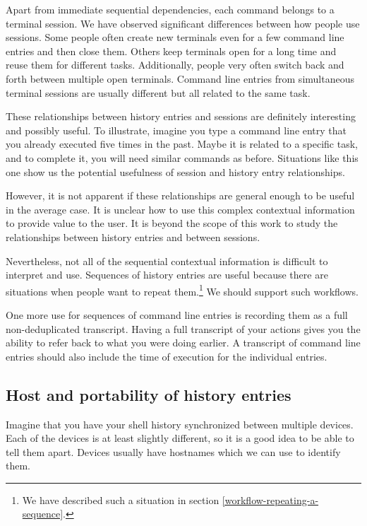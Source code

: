 Apart from immediate sequential dependencies, each command belongs to a terminal session. We have observed significant differences between how people use sessions. Some people often create new terminals even for a few command line entries and then close them. Others keep terminals open for a long time and reuse them for different tasks.
Additionally, people very often switch back and forth between multiple open terminals. Command line entries from simultaneous terminal sessions are usually different but all related to the same task.

These relationships between history entries and sessions are definitely interesting and possibly useful. To illustrate, imagine you type a command line entry that you already executed five times in the past. Maybe it is related to a specific task, and to complete it, you will need similar commands as before. Situations like this one show us the potential usefulness of session and history entry relationships.

However, it is not apparent if these relationships are general enough to be useful in the average case. It is unclear how to use this complex contextual information to provide value to the user. It is beyond the scope of this work to study the relationships between history entries and between sessions.

Nevertheless, not all of the sequential contextual information is difficult to interpret and use. Sequences of history entries are useful because there are situations when people want to repeat them.\footnote{We have described such a situation in section \ref{workflow-repeating-a-sequence}.} We should support such workflows.

One more use for sequences of command line entries is recording them as a full non-deduplicated transcript. Having a full transcript of your actions gives you the ability to refer back to what you were doing earlier. A transcript of command line entries should also include the time of execution for the individual entries.

\subsection{Host and portability of history entries}

Imagine that you have your shell history synchronized between multiple devices.
Each of the devices is at least slightly different, so it is a good idea to be able to tell them apart. Devices usually have hostnames which we can use to identify them. 

